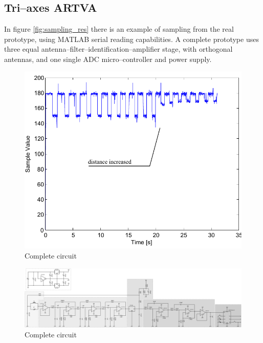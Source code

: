 \subsection{Tri--axes ARTVA}
In figure \ref{fig:sampling_res} there is an example of sampling from the real prototype, using MATLAB serial reading capabilities. A complete prototype uses three equal antenna--filter--identification--amplifier stage, with orthogonal antennas, and one single ADC micro--controller and power supply.
\begin{figure}[h]
	\centering
	\includegraphics[scale=0.65]{ch2/img/sampling_result.pdf}
	\caption{Complete circuit}
	\label{fig:completecirc}
\end{figure}
\begin{figure}[p]
	\centering
	\includegraphics[scale=0.25,angle=90]{ch2/img/receiver3.pdf}
	\caption{Complete circuit}
	\label{fig:completecirc}
	\forceversofloat
\end{figure}